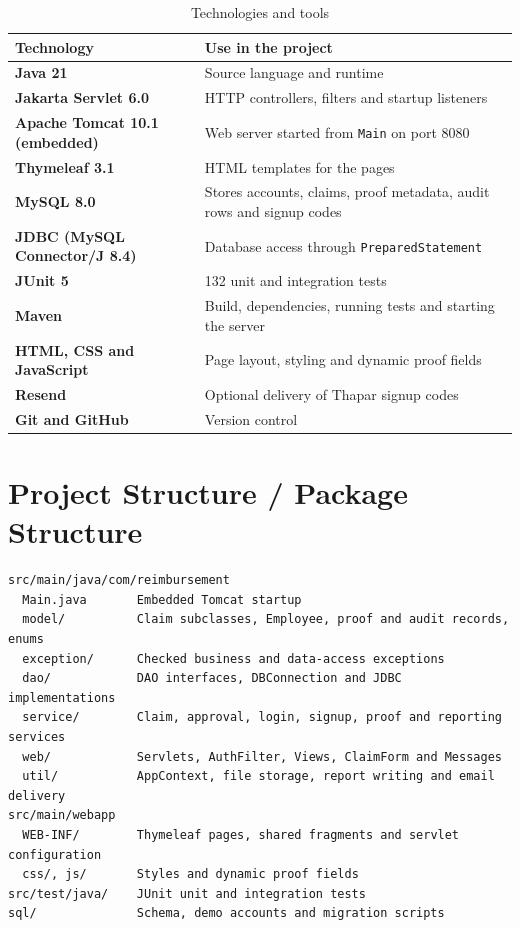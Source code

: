 \documentclass[12pt,a4paper]{report}
\begin{document}
\begin{table}[H]
\centering
\begin{singlespace}
\begin{tabularx}{\linewidth}{>{\bfseries}l Y}
\toprule
Technology & Use in the project\\
\midrule
Java 21 & Source language and runtime\\
Jakarta Servlet 6.0 & HTTP controllers, filters and startup listeners\\
Apache Tomcat 10.1 (embedded) & Web server started from \texttt{Main} on port 8080\\
Thymeleaf 3.1 & HTML templates for the pages\\
MySQL 8.0 & Stores accounts, claims, proof metadata, audit rows and signup codes\\
JDBC (MySQL Connector/J 8.4) & Database access through \texttt{PreparedStatement}\\
JUnit 5 & 132 unit and integration tests\\
Maven & Build, dependencies, running tests and starting the server\\
HTML, CSS and JavaScript & Page layout, styling and dynamic proof fields\\
Resend & Optional delivery of Thapar signup codes\\
Git and GitHub & Version control\\
\bottomrule
\end{tabularx}
\end{singlespace}
\caption{Technologies and tools}
\end{table}

\section{Project Structure / Package Structure}

\begin{lstlisting}[language={}]
src/main/java/com/reimbursement
  Main.java       Embedded Tomcat startup
  model/          Claim subclasses, Employee, proof and audit records, enums
  exception/      Checked business and data-access exceptions
  dao/            DAO interfaces, DBConnection and JDBC implementations
  service/        Claim, approval, login, signup, proof and reporting services
  web/            Servlets, AuthFilter, Views, ClaimForm and Messages
  util/           AppContext, file storage, report writing and email delivery
src/main/webapp
  WEB-INF/        Thymeleaf pages, shared fragments and servlet configuration
  css/, js/       Styles and dynamic proof fields
src/test/java/    JUnit unit and integration tests
sql/              Schema, demo accounts and migration scripts
\end{lstlisting}
\end{document}
